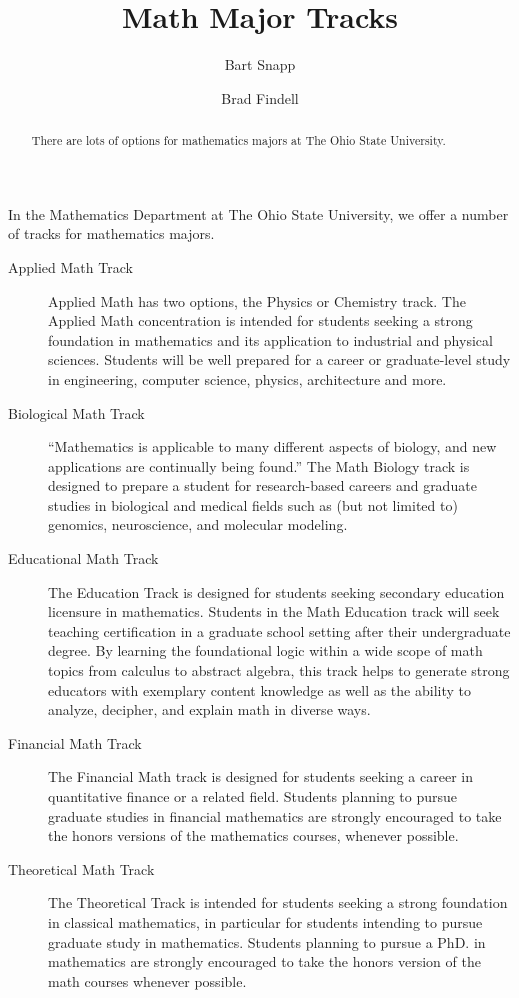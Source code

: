 \documentclass[handout,nooutcomes,space]{ximera}
\title{Math Major Tracks}
\author{Bart Snapp \and Brad Findell}
\begin{document}
\begin{abstract}
There are lots of options for mathematics majors at The Ohio State University. 
\end{abstract}
\maketitle

In the Mathematics Department at The Ohio State University, we offer a
number of tracks for mathematics majors.

\begin{description}
\item[Applied Math Track] Applied Math has two options, the Physics or Chemistry track. The Applied Math concentration is intended for students seeking a strong foundation in mathematics and its application to industrial and physical sciences. Students will be well prepared for a career or graduate-level study in engineering, computer science, physics, architecture and more.
 
\item[Biological Math Track] ``Mathematics is applicable to many different aspects of biology, and new applications are continually being found.'' The Math Biology track is designed to prepare a student for research-based careers and graduate studies in biological and medical fields such as (but not limited to) genomics, neuroscience, and molecular modeling.
 
\item[Educational Math Track] The Education Track is designed for students seeking secondary education licensure in mathematics. Students in the Math Education track will seek teaching certification in a graduate school setting after their undergraduate degree. By learning the foundational logic within a wide scope of math topics from calculus to abstract algebra, this track helps to generate strong educators with exemplary content knowledge as well as the ability to analyze, decipher, and explain math in diverse ways.
 
\item[Financial Math Track] The Financial Math track is designed for students seeking a career in quantitative finance or a related field. Students planning to pursue graduate studies in financial mathematics are strongly encouraged to take the honors versions of the mathematics courses, whenever possible.
 
\item[Theoretical Math Track] The Theoretical Track is intended for students seeking a strong foundation in classical mathematics, in particular for students intending to pursue graduate study in mathematics. Students planning to pursue a PhD. in mathematics are strongly encouraged to take the honors version of the math courses whenever possible.
\end{description}
\end{document}
